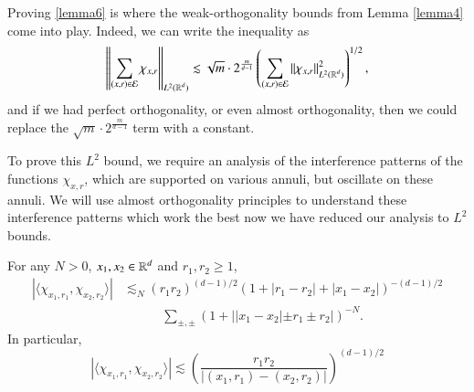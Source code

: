 Proving \ref{lemma6} is where the weak-orthogonality bounds from Lemma \ref{lemma4} come into play. Indeed, we can write the inequality as
%
\[ \left\| \sum_{(x,r) \in \mathcal{E}} \chi_{x,r} \right\|_{L^2(\operatorname{\mathbb{R}}^d)} \lesssim \sqrt{m} \cdot 2^{ \frac{m}{d-1} } \left( \sum_{(x,r) \in \mathcal{E}} \| \chi_{x,r} \|_{L^2(\operatorname{\mathbb{R}}^d)}^2 \right)^{1/2}, \]
%
and if we had perfect orthogonality, or even almost orthogonality, then we could replace the $\sqrt{m} \cdot 2^{\frac{m}{d-1}}$ term with a constant.

To prove this $L^2$ bound, we require an analysis of the interference patterns of the functions $\chi_{x,r}$, which are supported on various annuli, but oscillate on these annuli. We will use almost orthogonality principles to understand these interference patterns which work the best now we have reduced our analysis to $L^2$ bounds.

%
%
%
%

\begin{lemma} \label{lemma4}
    For any $N > 0$, $x_1,x_2 \in \operatorname{\mathbb{R}}^d$ and $r_1,r_2 \geq 1$,
    \begin{align*}
        |\langle \chi_{x_1,r_1}, \chi_{x_2,r_2} \rangle| &\lesssim_N (r_1r_2)^{(d-1)/2} (1 + |r_1 - r_2| + |x_1 - x_2|)^{-(d-1)/2}\\
        &\quad\quad\quad\sum_{\pm,\pm} (1 + ||x_1 - x_2| \pm r_1 \pm r_2|)^{-N}.
    \end{align*}
    In particular,
    \[ |\langle \chi_{x_1,r_1}, \chi_{x_2,r_2} \rangle| \lesssim \left( \frac{r_1r_2}{|(x_1,r_1) - (x_2,r_2)|} \right)^{(d-1)/2} \]
\end{lemma}

